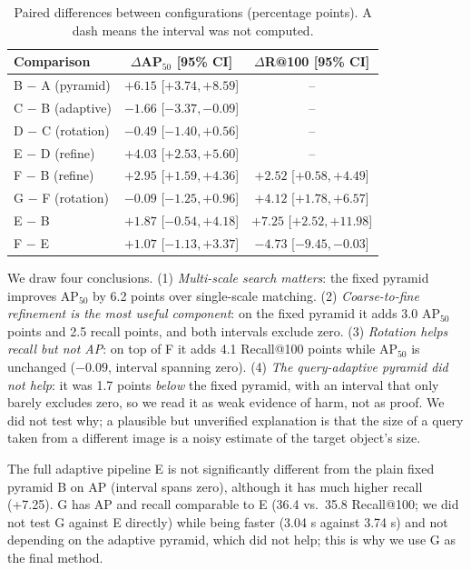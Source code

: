 \documentclass[10pt,twocolumn,letterpaper]{article}
\newcommand{\ap}{AP$_{50}$}
\begin{document}
\begin{table}[t]
\centering\small
\setlength{\tabcolsep}{3pt}
\begin{tabular}{@{}lcc@{}}
\toprule
Comparison & $\Delta$\ap{} [95\% CI] & $\Delta$R@100 [95\% CI]\\
\midrule
B $-$ A (pyramid) & $+6.15$ [$+3.74,+8.59$] & --\\
C $-$ B (adaptive) & $-1.66$ [$-3.37,-0.09$] & --\\
D $-$ C (rotation) & $-0.49$ [$-1.40,+0.56$] & --\\
E $-$ D (refine) & $+4.03$ [$+2.53,+5.60$] & --\\
\midrule
F $-$ B (refine) & $+2.95$ [$+1.59,+4.36$] & $+2.52$ [$+0.58,+4.49$]\\
G $-$ F (rotation) & $-0.09$ [$-1.25,+0.96$] & $+4.12$ [$+1.78,+6.57$]\\
E $-$ B & $+1.87$ [$-0.54,+4.18$] & $+7.25$ [$+2.52,+11.98$]\\
F $-$ E & $+1.07$ [$-1.13,+3.37$] & $-4.73$ [$-9.45,-0.03$]\\
\bottomrule
\end{tabular}
\caption{Paired differences between configurations (percentage points). A dash means the interval was not computed.}
\label{tab:ci}
\end{table}

We draw four conclusions. (1) \emph{Multi-scale search matters}: the fixed pyramid improves \ap{} by 6.2 points over single-scale matching. (2) \emph{Coarse-to-fine refinement is the most useful component}: on the fixed pyramid it adds 3.0 \ap{} points and 2.5 recall points, and both intervals exclude zero. (3) \emph{Rotation helps recall but not AP}: on top of F it adds 4.1 Recall@100 points while \ap{} is unchanged ($-0.09$, interval spanning zero). (4) \emph{The query-adaptive pyramid did not help}: it was 1.7 points \emph{below} the fixed pyramid, with an interval that only barely excludes zero, so we read it as weak evidence of harm, not as proof. We did not test why; a plausible but unverified explanation is that the size of a query taken from a different image is a noisy estimate of the target object's size.

The full adaptive pipeline E is not significantly different from the plain fixed pyramid B on AP (interval spans zero), although it has much higher recall (+7.25). G has AP and recall comparable to E (36.4 vs.\ 35.8 Recall@100; we did not test G against E directly) while being faster (3.04 s against 3.74 s) and not depending on the adaptive pyramid, which did not help; this is why we use G as the final method.
\end{document}

